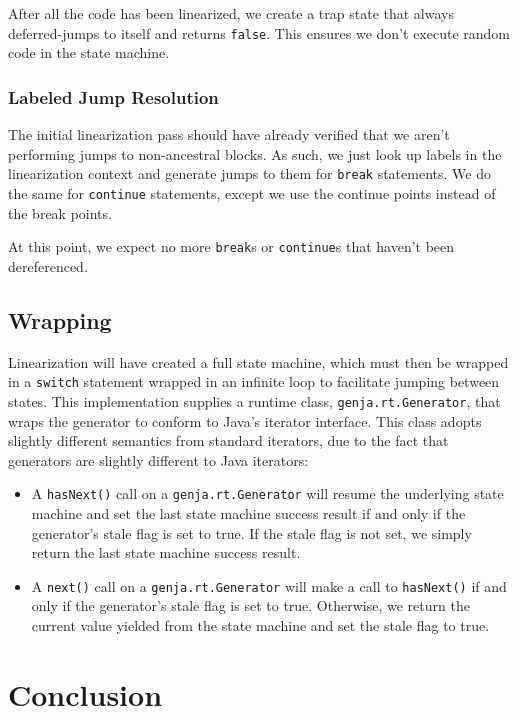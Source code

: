 \documentclass[journal,a4paper]{IEEEtran}
\begin{document}
After all the code has been linearized, we create a trap state that always deferred-jumps to itself
and returns \texttt{false}. This ensures we don't execute random code in the state machine.

\subsubsection{Labeled Jump Resolution}

The initial linearization pass should have already verified that we aren't performing jumps to
non-ancestral blocks. As such, we just look up labels in the linearization context and generate
jumps to them for \texttt{break} statements. We do the same for \texttt{continue} statements,
except we use the continue points instead of the break points.

At this point, we expect no more \texttt{break}s or \texttt{continue}s that haven't been
dereferenced.

\subsection{Wrapping}

Linearization will have created a full state machine, which must then be wrapped in a
\texttt{switch} statement wrapped in an infinite loop to facilitate jumping between states. This
implementation supplies a runtime class, \texttt{genja.rt.Generator}, that wraps the generator to
conform to Java's iterator interface. This class adopts slightly different semantics from standard
iterators, due to the fact that generators are slightly different to Java iterators:

\begin{itemize}
\item A \texttt{hasNext()} call on a \texttt{genja.rt.Generator} will resume the underlying state
machine and set the last state machine success result if and only if the generator's stale flag is
set to true. If the stale flag is not set, we simply return the last state machine success result.

\item A \texttt{next()} call on a \texttt{genja.rt.Generator} will make a call to
\texttt{hasNext()} if and only if the generator's stale flag is set to true. Otherwise, we return
the current value yielded from the state machine and set the stale flag to true.
\end{itemize}

\section{Conclusion}
\end{document}
